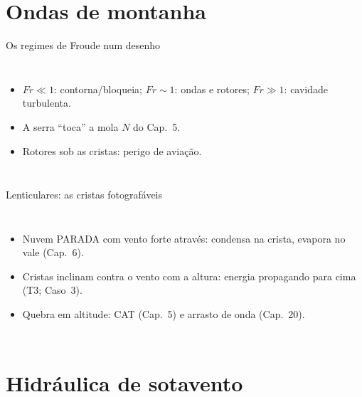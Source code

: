 \documentclass[aspectratio=169,11pt]{beamer}
\begin{document}
\section{Ondas de montanha}

\begin{frame}{Os regimes de Froude num desenho}
  \begin{columns}
    \begin{itemize}
      \item $Fr \ll 1$: contorna/bloqueia; $Fr \sim 1$: ondas e
            rotores; $Fr \gg 1$: cavidade turbulenta.
      \item A serra ``toca'' a mola $N$ do Cap.~5.
      \item Rotores sob as cristas: perigo de aviação.
    \end{itemize}
  \end{columns}
\end{frame}

\begin{frame}{Lenticulares: as cristas fotografáveis}
  \begin{columns}
    \vspace{0.4em}
    \begin{itemize}
      \item Nuvem PARADA com vento forte através: condensa na crista,
            evapora no vale (Cap.~6).
      \item Cristas inclinam contra o vento com a altura: energia
            propagando para cima (T3; Caso~3).
      \item Quebra em altitude: CAT (Cap.~5) e arrasto de onda
            (Cap.~20).
    \end{itemize}
  \end{columns}
\end{frame}

\section{Hidráulica de sotavento}
\end{document}
